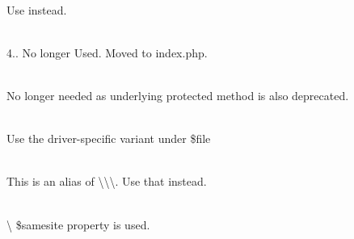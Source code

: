 \begin{DoxyRefList}
\item[Member \doxylink{class_code_igniter_1_1_session_1_1_session_a2a03ed97c99ae31f14c4334929b5caad}{Code\+Igniter\textbackslash{}Session\textbackslash{}Session\+::stop} ()]\hfill \\
\label{deprecated__deprecated000133}%
%
Use  instead.  
\item[Member \doxylink{class_code_igniter_1_1_test_1_1_mock_1_1_mock_code_igniter_ac00f34b18353178dec219a0260c9d316}{Code\+Igniter\textbackslash{}Test\textbackslash{}Mock\textbackslash{}Mock\+Code\+Igniter\+::call\+Exit} (\$code)]\hfill \\
\label{deprecated__deprecated000134}%
%
4.. No longer Used. Moved to index.\+php.  
\item[Member \doxylink{class_code_igniter_1_1_test_1_1_test_logger_a6f51e071d0daded2729dc0a2104c4649}{Code\+Igniter\textbackslash{}Test\textbackslash{}Test\+Logger\+::cleanup} (\$file)]\hfill \\
\label{deprecated__deprecated000135}%
%
No longer needed as underlying protected method is also deprecated.  
\item[Member \doxylink{class_config_1_1_cache_a3a4c4e232d03b0577ff485a165178a9d}{Config\textbackslash{}Cache\+::\$store\+Path} ]\hfill \\
\label{deprecated__deprecated000001}%
%
Use the driver-\/specific variant under \$file  
\item[Member \doxylink{class_config_1_1_format_ad33bee4523a8a72d55f3b39bbef23844}{Config\textbackslash{}Format\+::get\+Formatter} (string \$mime)]\hfill \\
\label{deprecated__deprecated000005}%
%
This is an alias of {\ttfamily \textbackslash{}\textbackslash{}\textbackslash{}}. Use that instead.  
\item[Member \doxylink{class_config_1_1_security_ae69ed890a29dd2952555bb08072138eb}{Config\textbackslash{}Security\+::\$samesite} ]\hfill \\
\label{deprecated__deprecated000006}%
%
{\ttfamily {}\textbackslash{}} \$samesite property is used. 
\end{DoxyRefList}